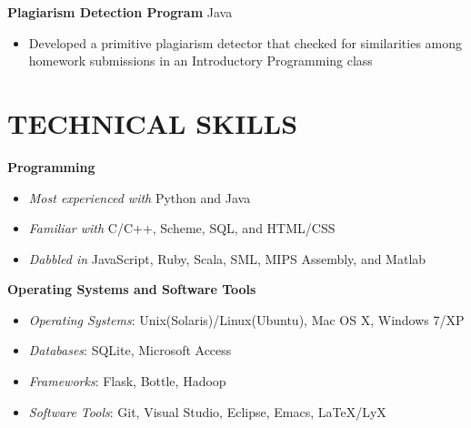 \documentclass[margin]{res}
\begin{document}
\begin{resume}
\textbf{Plagiarism Detection Program} \hfill Java
\begin{itemize}[leftmargin=10pt]
\itemsep -2pt %
\item Developed a primitive plagiarism detector that checked for similarities among homework submissions in an Introductory Programming class
\end{itemize}

\section{TECHNICAL SKILLS}
\textbf{Programming}
\begin{itemize}[leftmargin=10pt]
\item \textit{Most experienced with} Python and Java
\item \textit{Familiar with} C/C++, Scheme, SQL, and HTML/CSS
\item \textit{Dabbled in} JavaScript, Ruby, Scala, SML, MIPS Assembly, and Matlab
\end{itemize}

\textbf{Operating Systems and Software Tools}
\begin{itemize}[leftmargin=10pt]
\item \textit{Operating Systems}: Unix(Solaris)/Linux(Ubuntu), Mac OS X, Windows 7/XP
\item \textit{Databases}: SQLite, Microsoft Access
\item \textit{Frameworks}: Flask, Bottle, Hadoop
\item \textit{Software Tools}: Git, Visual Studio, Eclipse, Emacs, \LaTeX{}/LyX
\end{itemize}

\end{resume}
\end{document}
